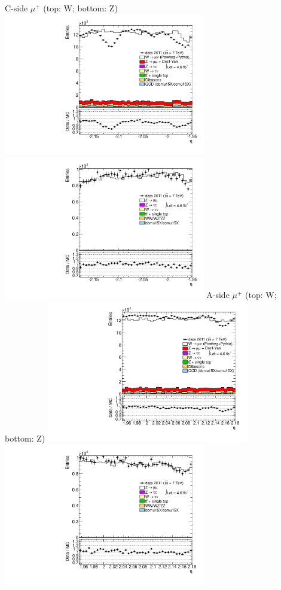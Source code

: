  {
\colb[T]
C-side $\mu^{+}$ (top: W; bottom: Z)
\centering
\includegraphics[width=0.66\textwidth]{dates/20130306/figures/etaphi/W_10_C_stack_l_eta_POS} \\
\includegraphics[width=0.66\textwidth]{dates/20130306/figures/etaphi/Z_10_C_stack_lP_eta_ALL.pdf}
A-side $\mu^{+}$ (top: W; bottom: Z)
\centering
\includegraphics[width=0.66\textwidth]{dates/20130306/figures/etaphi/W_10_A_stack_l_eta_POS} \\
\includegraphics[width=0.66\textwidth]{dates/20130306/figures/etaphi/Z_10_A_stack_lP_eta_ALL.pdf} 
\cole
}

